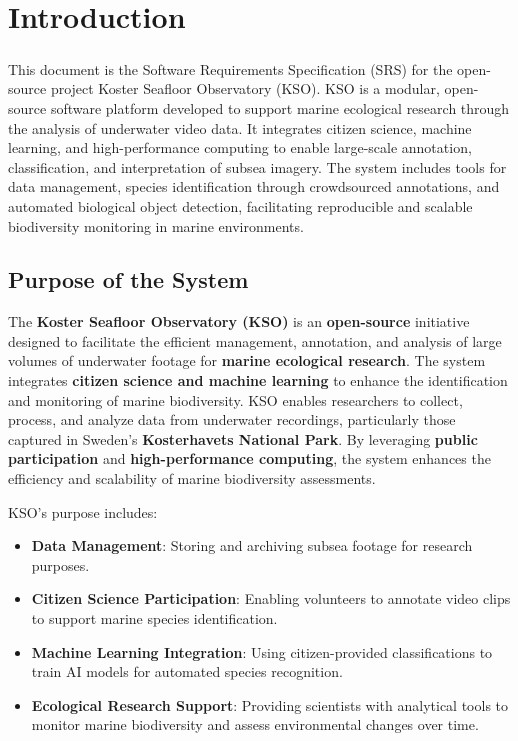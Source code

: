 
\chapter{Introduction} \label{introduction}

\paragraph{}
This document is the Software Requirements Specification (SRS) \cite{iso29148} for the open-source project Koster Seafloor Observatory (KSO). KSO is a modular, open-source software platform developed to support marine ecological research through the analysis of underwater video data. It integrates citizen science, machine learning, and high-performance computing to enable large-scale annotation, classification, and interpretation of subsea imagery. The system includes tools for data management, species identification through crowdsourced annotations, and automated biological object detection, facilitating reproducible and scalable biodiversity monitoring in marine environments.
\section{Purpose of the System }
The \textbf{Koster Seafloor Observatory (KSO)} is an \textbf{open-source} initiative designed to facilitate the efficient management, annotation, and analysis of large volumes of underwater footage for \textbf{marine ecological research}. The system integrates \textbf{citizen science and machine learning} to enhance the identification and monitoring of marine biodiversity. KSO enables researchers to collect, process, and analyze data from underwater recordings, particularly those captured in Sweden’s \textbf{Kosterhavets National Park}. By leveraging \textbf{public participation} and \textbf{high-performance computing}, the system enhances the efficiency and scalability of marine biodiversity assessments.

KSO's purpose includes:
\begin{itemize}
    \item \textbf{Data Management}: Storing and archiving subsea footage for research purposes.
    \item \textbf{Citizen Science Participation}: Enabling volunteers to annotate video clips to support marine species identification.
    \item \textbf{Machine Learning Integration}: Using citizen-provided classifications to train AI models for automated species recognition.
    \item \textbf{Ecological Research Support}: Providing scientists with analytical tools to monitor marine biodiversity and assess environmental changes over time.
\end{itemize}

